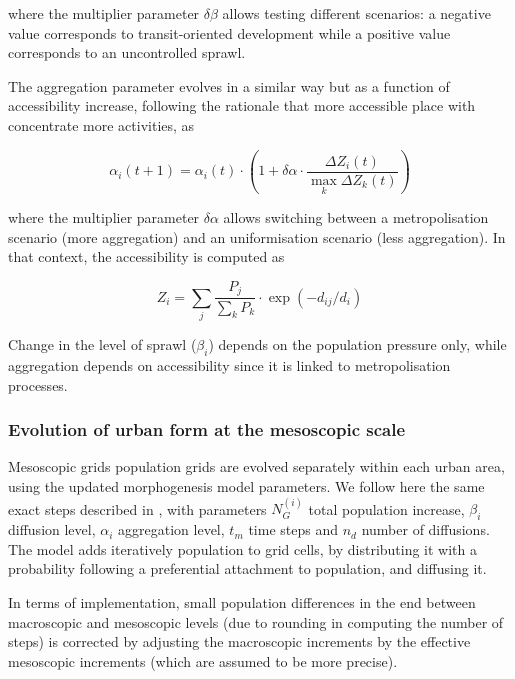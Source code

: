 \documentclass[11pt]{article}
\begin{document}
where the multiplier parameter $\delta\beta$ allows testing different scenarios: a negative value corresponds to transit-oriented development while a positive value corresponds to an uncontrolled sprawl.
			
The aggregation parameter evolves in a similar way but as a function of accessibility increase, following the rationale that more accessible place with concentrate more activities, as
 
\begin{equation}
	\label{eq:eq5}
	\alpha_i (t+1) = \alpha_i (t) \cdot \left(1 + \delta\alpha \cdot \frac{\Delta Z_i (t)}{\max_k  \Delta Z_k (t)}\right)
\end{equation}
			
where the multiplier parameter $\delta\alpha$ allows switching between a metropolisation scenario (more aggregation) and an uniformisation scenario (less aggregation). In that context, the accessibility is computed as
			
\begin{equation}
	\label{eq:eq5}
	Z_i = \sum_j \frac{P_j}{\sum_k P_k} \cdot \exp( - d_{ij} / d_i)
\end{equation}
			
Change in the level of sprawl ($\beta_i$) depends on the population pressure only, while aggregation depends on accessibility since it is linked to metropolisation processes.




\subsubsection{Evolution of urban form at the mesoscopic scale}
	
Mesoscopic grids population grids are evolved separately within each urban area, using the updated morphogenesis model parameters. We follow here the same exact steps described in \cite{raimbault2018calibration}, with parameters $N_G^{(i)}$ total population increase, $\beta_i$ diffusion level, $\alpha_i$ aggregation level, $t_m$ time steps and $n_d$ number of diffusions. The model adds iteratively population to grid cells, by distributing it with a probability following a preferential attachment to population, and diffusing it.

In terms of implementation, small population differences in the end between macroscopic and mesoscopic levels (due to rounding in computing the number of steps) is corrected by adjusting the macroscopic increments by the effective mesoscopic increments (which are assumed to be more precise).
	
\end{document}
